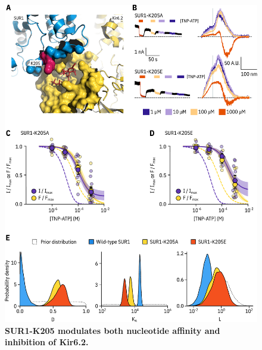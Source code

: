 \documentclass[10pt,lineno, doublespacing]{elife}
\begin{document}
\begin{figure}
\begin{fullwidth}
\centering
\includegraphics[height=0.95\textheight]{figure_four}
\caption{\textbf{SUR1-K205 modulates both nucleotide affinity and inhibition of Kir6.2.}}
\label{fig:four}
\end{fullwidth}
\end{figure}
\end{document}
